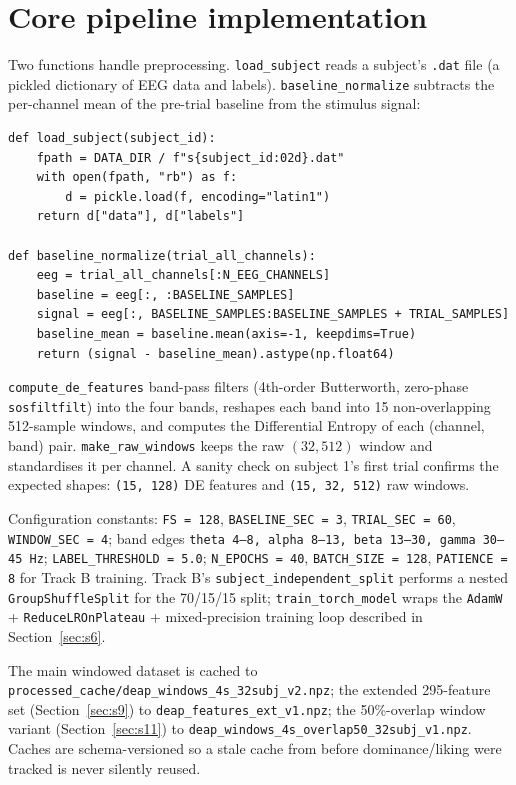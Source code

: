\documentclass[11pt]{report}
\begin{document}
\section{Core pipeline implementation}
Two functions handle preprocessing. \texttt{load\_subject} reads a subject's
\texttt{.dat} file (a pickled dictionary of EEG data and labels).
\texttt{baseline\_normalize} subtracts the per-channel mean of the pre-trial
baseline from the stimulus signal:
\begin{lstlisting}
def load_subject(subject_id):
    fpath = DATA_DIR / f"s{subject_id:02d}.dat"
    with open(fpath, "rb") as f:
        d = pickle.load(f, encoding="latin1")
    return d["data"], d["labels"]

def baseline_normalize(trial_all_channels):
    eeg = trial_all_channels[:N_EEG_CHANNELS]
    baseline = eeg[:, :BASELINE_SAMPLES]
    signal = eeg[:, BASELINE_SAMPLES:BASELINE_SAMPLES + TRIAL_SAMPLES]
    baseline_mean = baseline.mean(axis=-1, keepdims=True)
    return (signal - baseline_mean).astype(np.float64)
\end{lstlisting}
\texttt{compute\_de\_features} band-pass filters (4th-order Butterworth,
zero-phase \texttt{sosfiltfilt}) into the four bands, reshapes each band into
15 non-overlapping 512-sample windows, and computes the Differential Entropy
of each (channel, band) pair. \texttt{make\_raw\_windows} keeps the raw
$(32, 512)$ window and standardises it per channel. A sanity check on
subject 1's first trial confirms the expected shapes: \texttt{(15, 128)} DE
features and \texttt{(15, 32, 512)} raw windows.

Configuration constants: \texttt{FS = 128}, \texttt{BASELINE\_SEC = 3},
\texttt{TRIAL\_SEC = 60}, \texttt{WINDOW\_SEC = 4}; band edges
\texttt{theta 4--8, alpha 8--13, beta 13--30, gamma 30--45\,Hz};
\texttt{LABEL\_THRESHOLD = 5.0}; \texttt{N\_EPOCHS = 40},
\texttt{BATCH\_SIZE = 128}, \texttt{PATIENCE = 8} for Track B training.
Track B's \texttt{subject\_independent\_split} performs a nested
\texttt{GroupShuffleSplit} for the 70/15/15 split; \texttt{train\_torch\_model}
wraps the \texttt{AdamW} + \texttt{ReduceLROnPlateau} + mixed-precision
training loop described in Section~\ref{sec:s6}.

The main windowed dataset is cached to
\texttt{processed\_cache/deap\_windows\_4s\_32subj\_v2.npz}; the extended
295-feature set (Section~\ref{sec:s9}) to
\texttt{deap\_features\_ext\_v1.npz}; the 50\%-overlap window variant
(Section~\ref{sec:s11}) to \texttt{deap\_windows\_4s\_overlap50\_32subj\_v1.npz}.
Caches are schema-versioned so a stale cache from before dominance/liking
were tracked is never silently reused.
\end{document}
